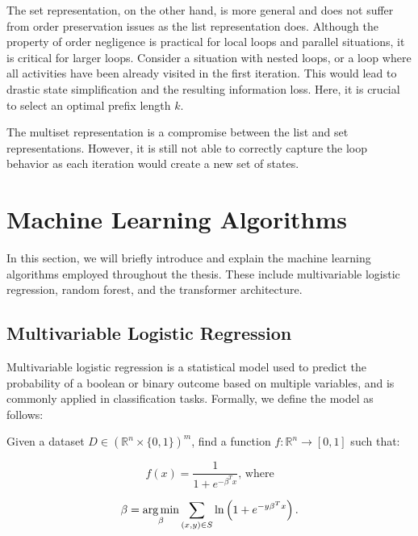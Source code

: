The set representation, on the other hand, is more general and does not suffer from order preservation issues as the list representation does. Although the property of order negligence is practical for local loops and parallel situations, it is critical for larger loops. Consider a situation with nested loops, or a loop where all activities have been already visited in the first iteration. This would lead to drastic state simplification and the resulting information loss. Here, it is crucial to select an optimal prefix length $k$.
 
The multiset representation is a compromise between the list and set representations. However, it is still not able to correctly capture the loop behavior as each iteration would create a new set of states.

\section{Machine Learning Algorithms}

In this section, we will briefly introduce and explain the machine learning algorithms employed throughout the thesis. These include multivariable logistic regression, random forest, and the transformer architecture.

\subsection{Multivariable Logistic Regression}

Multivariable logistic regression is a statistical model used to predict the probability of a boolean or binary outcome based on multiple variables, and is commonly applied in classification tasks. Formally, we define the model as follows:

\begin{definition}
    Given a dataset $D \in (\mathbb{R}^n \times \{0, 1\})^m$, find a function $f: \mathbb{R}^n \rightarrow [0, 1]$ such that:

    \[
        f(x) = \frac{1}{1 + e^{-\beta^T x}} \text{, where}
    \]


    \[
        \beta = \operatorname*{arg\,min}_{\beta} \sum_{(x, y) \in S} \ln \left( 1  + e^{-y \beta^T x} \right).
    \]
\end{definition}

    

